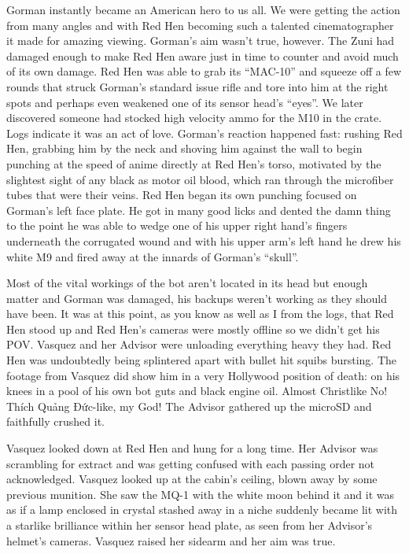 \documentclass[13pt|draft]{report}
\begin{document}
Gorman instantly became an American hero to us all. We were getting the action from many angles and with Red Hen becoming such a talented cinematographer it made for amazing viewing. Gorman's aim wasn't true, however. The Zuni had damaged enough to make Red Hen aware just in time to counter and avoid much of its own damage. Red Hen was able to grab its ``MAC-10'' and squeeze off a few rounds that struck Gorman's standard issue rifle and tore into him at the right spots and perhaps even weakened one of its sensor head's ``eyes''. We later discovered someone had stocked high velocity ammo for the M10 in the crate. Logs indicate it was an act of love. Gorman's reaction happened fast: rushing Red Hen, grabbing him by the neck and shoving him against the wall to begin punching at the speed of anime directly at Red Hen's torso, motivated by the slightest sight of any black as motor oil blood, which ran through the microfiber tubes that were their veins. Red Hen began its own punching focused on Gorman's left face plate. He got in many good licks and dented the damn thing to the point he was able to wedge one of his upper right hand's fingers underneath the corrugated wound and with his upper arm's left hand he drew his white M9 and fired away at the innards of Gorman's ``skull''. 

Most of the vital workings of the bot aren't located in its head but enough matter and Gorman was damaged, his backups weren't working as they should have been. It was at this point, as you know as well as I from the logs, that Red Hen stood up and Red Hen's cameras were mostly offline so we didn't get his POV. Vasquez and her Advisor were unloading everything heavy they had. Red Hen was undoubtedly being splintered apart with bullet hit squibs bursting. The footage from Vasquez did show him in a very Hollywood position of death: on his knees in a pool of his own bot guts and black engine oil. Almost Christlike No! Thích Quảng Đức-like, my God! The Advisor gathered up the microSD and faithfully crushed it.

Vasquez looked down at Red Hen and hung for a long time. Her Advisor was scrambling for extract and was getting confused with each passing order not acknowledged. Vasquez looked up at the cabin's ceiling, blown away by some previous munition. She saw the MQ-1 with the white moon behind it and it was as if a lamp enclosed in crystal stashed away in a niche suddenly became lit with a starlike brilliance within her sensor head plate, as seen from her Advisor's helmet's cameras. Vasquez raised her sidearm and her aim was true.\\
\end{document}
